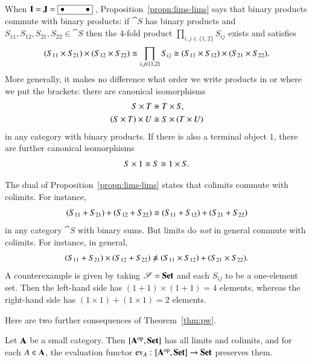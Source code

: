 \begin{example}
\label{eg:lims-lims}
When $\mathbf{I} = \mathbf{J} = \fbox{$\bullet \hspace*{2.5em} \bullet$}\ $,
Proposition~\ref{propn:lims-lims} says that binary products commute with
binary products: if $\cat{S}$ has binary products and $S_{11}, S_{12},
S_{21}, S_{22} \in \cat{S}$ then the 4-fold product $\prod_{i, j \in \{1,
  2\}} S_{ij}$ exists and satisfies
\[
(S_{11} \times S_{21}) \times (S_{12} \times S_{22})
\cong
\prod_{i, j \in \{1, 2\}} S_{ij}
\cong
(S_{11} \times S_{12}) \times (S_{21} \times S_{22}).
\]
More generally, it makes no difference what order we write products in or
where we put the brackets: there are canonical isomorphisms
%
\begin{align*}
S \times T              &
\iso
T \times S,
%
\index{product!commutativity of}
%
\\
(S \times T) \times U   &
\iso
S \times (T \times U)
%
\index{product!associativity of}%
\index{associativity}
%
\end{align*}
%
in any category with binary products.   If there is also a terminal object
$1$, there are further canonical isomorphisms
\[
S \times 1
\cong
S
\cong
1 \times S.
\]
\end{example}

\begin{warning}
The dual of Proposition~\ref{propn:lims-lims} states that colimits commute
with colimits.  For instance,
\[
(S_{11} + S_{21}) + (S_{12} + S_{22})
\cong
(S_{11} + S_{12}) + (S_{21} + S_{22})
\]
in any category $\cat{S}$ with binary sums.  But limits do \emph{not}%
%
%
in general commute with colimits.  For instance, in general,
\[
(S_{11} + S_{21}) \times (S_{12} + S_{22})
\not\iso
(S_{11} \times S_{12}) + (S_{21} \times S_{22}).
\]
A counterexample is given by taking $\mathscr{S} = \mathbf{Set}$ and each $S_{ij}$ to be a
one-element set.  Then the left-hand side has $(1 + 1) \times (1 + 1) = 4$
elements, whereas the right-hand side has $(1 \times 1) + (1 \times 1) = 2$
elements.
\end{warning}

Here are two further consequences of Theorem~\ref{thm:pw}.

\begin{cor}
%
%
Let $\mathbf{A}$ be a small category.  Then $[\mathbf{A}^{\mathrm{op}},\mathbf{Set}]$ has all limits and
colimits, and for each $A \in \mathbf{A}$, the evaluation functor $\ev_A\from
\pshf{\scat{A}} \to \Set$ preserves them.
\end{cor}

